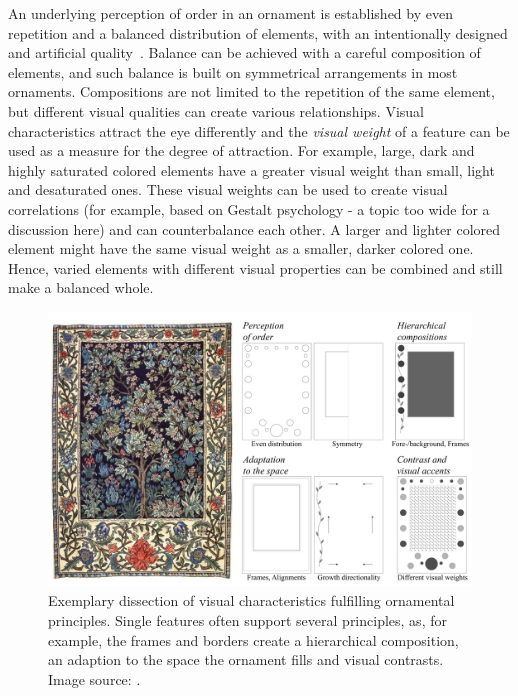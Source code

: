 

An underlying perception of order in an ornament is established by even repetition and a balanced distribution of elements, with an intentionally designed and artificial quality~\cite{ward_1896_tpo}. Balance can be achieved with a careful composition of elements, and such balance is built on symmetrical arrangements in most ornaments. Compositions are not limited to the repetition of the same element, but different visual qualities can create various relationships. Visual characteristics attract the eye differently and the \textit{visual weight} of a feature can be used as a measure for the degree of attraction. For example, large, dark and highly saturated colored elements have a greater visual weight than small, light and desaturated ones. These visual weights can be used to create visual correlations (for example, based on Gestalt psychology - a topic too wide for a discussion here) and can counterbalance each other. A larger and lighter colored element might have the same visual weight as a smaller, darker colored one. Hence, varied elements with different visual properties can be combined and still make a balanced whole.


\begin{figure}
       \includegraphics[width=1\columnwidth]{figures/ornament/ornament_principles.pdf}
        \caption[Ornamentation principles]{\label{fig:ornamentation_principles} Exemplary dissection of visual characteristics fulfilling ornamental principles. Single features often support several principles, as, for example, the frames and borders create a hierarchical composition, an adaption to the space the ornament fills and visual contrasts. Image source: \cite{morris_1910_tol}.}
\end{figure}

